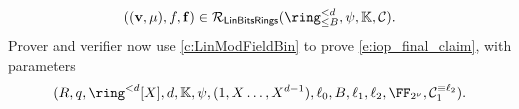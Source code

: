 \documentclass[11pt,letterpaper,usenames,dvipsnames]{article}
\begin{document}
\begin{construction}
\begin{enumerate}[leftmargin=*]
\begin{itemize}[leftmargin=*]
%
\begin{equation}\label{e:iop_final_claim}
((\vv,\mu),f,\bff) \in \LinModFieldBin(\ringtwobounds{B}{\moduledegree},\psi,\KK, \cC).
\end{equation}
%
Prover and verifier now use \cref{c:LinModFieldBin} to prove  \eqref{e:iop_final_claim}, with parameters $$(R,q,\ringdegbound{\moduledegree}[X],\moduledegree,\KK, \psi, (1, X \ldots, X^{\moduledegree-1}), \codedim_0, B, \codedim_1,\codedim_2, \comfield,\cC_1^{\equiv \codedim_2}).$$
%
\end{itemize}
\end{enumerate}
    
\end{construction}




\begin{remark}\label{r:sampling_field}
\end{remark}
\end{document}
